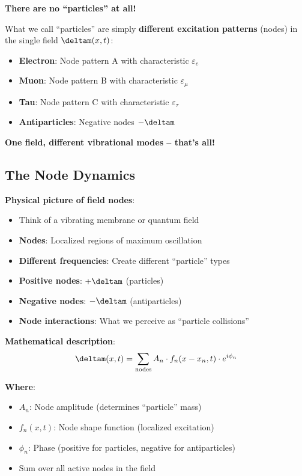 	\begin{tcolorbox}[colback=purple!5!white,colframe=purple!75!black,title=Ultimate Truth: No Separate Particles]
		\textbf{There are no ``particles'' at all!}
		
		What we call ``particles'' are simply \textbf{different excitation patterns} (nodes) in the single field $\deltam(x,t)$:
		
		\begin{itemize}
			\item \textbf{Electron}: Node pattern A with characteristic $\varepsilon_e$
			\item \textbf{Muon}: Node pattern B with characteristic $\varepsilon_{\mu}$
			\item \textbf{Tau}: Node pattern C with characteristic $\varepsilon_{\tau}$
			\item \textbf{Antiparticles}: Negative nodes $-\deltam$
		\end{itemize}
		
		\textbf{One field, different vibrational modes -- that's all!}
	\end{tcolorbox}
	
	\subsection{The Node Dynamics}
	
	\textbf{Physical picture of field nodes}:
	\begin{itemize}
		\item Think of a vibrating membrane or quantum field
		\item \textbf{Nodes}: Localized regions of maximum oscillation
		\item \textbf{Different frequencies}: Create different ``particle'' types
		\item \textbf{Positive nodes}: $+\deltam$ (particles)
		\item \textbf{Negative nodes}: $-\deltam$ (antiparticles)
		\item \textbf{Node interactions}: What we perceive as ``particle collisions''
	\end{itemize}
	
	\textbf{Mathematical description}:
	\begin{equation}
		\deltam(x,t) = \sum_{\text{nodes}} A_n \cdot f_n(x-x_n, t) \cdot e^{i\phi_n}
	\end{equation}
	
	\textbf{Where}:
	\begin{itemize}
		\item $A_n$: Node amplitude (determines ``particle'' mass)
		\item $f_n(x,t)$: Node shape function (localized excitation)
		\item $\phi_n$: Phase (positive for particles, negative for antiparticles)
		\item Sum over all active nodes in the field
	\end{itemize}
	
